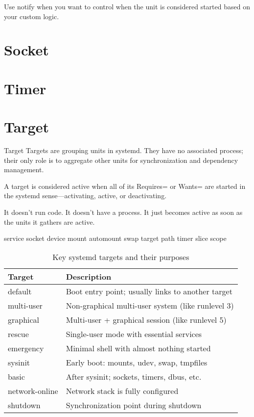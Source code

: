 \documentclass[openany, 12pt]{book}
\begin{document}
Use notify when you want to control when the unit is considered started based on
your custom logic.

\section{Socket}

\section{Timer}

\section{Target}
\begin{definition}{Target}{}
  Targets are grouping units in systemd. They have no associated process;
  their only role is to aggregate other units for synchronization and
  dependency management.
\end{definition}

A target is considered active when all of its Requires= or Wants= are started
in the systemd sense---activating, active, or deactivating.

It doesn’t run code. It doesn't have a process. It just becomes active as soon
as the units it gathers are active.

service
socket
device
mount
automount
swap
target
path
timer
slice
scope


\begin{table}[h]
  \centering
  \begin{tabular}{ll}
    \toprule
    \textbf{Target} & \textbf{Description}                              \\
    \midrule
    default         & Boot entry point; usually links to another target \\
    multi-user      & Non-graphical multi-user system (like runlevel 3) \\
    graphical       & Multi-user + graphical session (like runlevel 5)  \\
    rescue          & Single-user mode with essential services          \\
    emergency       & Minimal shell with almost nothing started         \\
    sysinit         & Early boot: mounts, udev, swap, tmpfiles          \\
    basic           & After sysinit; sockets, timers, dbus, etc.        \\
    network-online  & Network stack is fully configured                 \\
    shutdown        & Synchronization point during shutdown             \\
    \bottomrule
  \end{tabular}
  \caption{Key systemd targets and their purposes}
\end{table}
\end{document}
